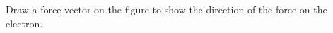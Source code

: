 \documentclass{../../oss-apphys-exam}
\begin{document}
\begin{questions}
\begin{parts}
\begin{subparts}
      \subpart Draw a force vector on the figure to show the direction of the
      force on the electron.
      \vspace{\stretch1}
    \end{subparts}
  \end{parts}
  \newpage
  
%  
%    
%    
%

\end{questions}
\end{document}
